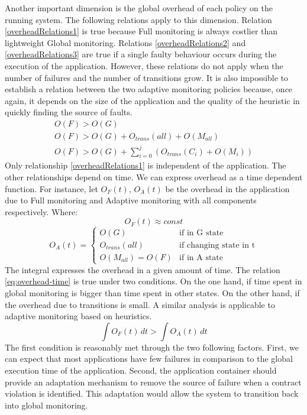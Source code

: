 Another important dimension is the global overhead of each policy on the running system.
The following relations apply to this dimension.
Relation \eqref{overheadRelations1} is true because Full monitoring is always costlier than lightweight Global monitoring.
Relations \eqref{overheadRelations2} and \eqref{overheadRelations3} are true if a single faulty behaviour occurs during the execution of the application.
However, these relations do not apply when the number of failures and the number of transitions grow.
It is also impossible to establish a relation between the two adaptive monitoring policies because, once again, it depends on the size of the application and the quality of the heuristic in quickly finding the source of faults. 
\begin{subequations}
\begin{align} 
 O(F) > O(G) \label{overheadRelations1}
\\ O(F) > O(G) + O_{trans}(all) + O(M_{all}) \label{overheadRelations2}
\\ O(F) > O(G) + \sum_{i=0}^{j}(O_{trans}(C_i) + O(M_i)) \label{overheadRelations3}
\end{align}
\end{subequations}
Only relationship \eqref{overheadRelations1} is independent of the application.
The other relationships depend on time.
We can express overhead as a time dependent function.
For instance, let $O_F(t)$,  $O_A(t)$ be the overhead in the application due to Full monitoring and Adaptive monitoring with all components respectively.
Where: 
\begin{equation*}
O_F(t)\approx const
\end{equation*}
\begin{equation*} 
O_A(t) = 
	\begin{cases}
   		O(G) & \text{if in G state} \\
   		O_{trans}(all) & \text{if changing state in t} \\
   		O(M_{all})=O(F) & \text{if in A state}
  	\end{cases} 
\end{equation*}
The integral expresses the overhead in a given amount of time.
The relation \eqref{eq:overhead-time} is true under two conditions.
On the one hand, if time spent in global monitoring is bigger than time spent in other states.
On the other hand, if the overhead due to transitions is small.
A similar analysis is applicable to adaptive monitoring based on heuristics.
\begin{equation}
\int O_F(t)\,dt > \int O_A(t)\,dt \label{eq:overhead-time}
\end{equation}
The first condition is reasonably met through the two following factors.
First, we can expect that most applications have few failures in comparison to the global execution time of the application.
Second, the application container should provide an adaptation mechanism to remove the source of failure when a contract violation is identified.
This adaptation would allow the system to transition back into global monitoring.

